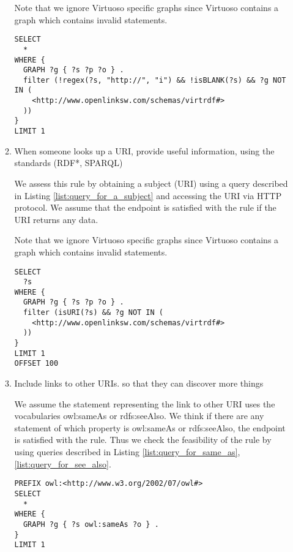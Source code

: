 \documentclass[11pt,a4paper]{article}
\begin{document}
\begin{itemize}
\begin{enumerate}
      Note that we ignore Virtuoso specific graphs since Virtuoso contains a graph which contains invalid statements.

      \begin{lstlisting}[basicstyle=\ttfamily\footnotesize,breaklines=true,frame=single,caption=A Query for searching non-HTTP-URI subjects,label=list:non_http_uri_subject]
SELECT
  *
WHERE {
  GRAPH ?g { ?s ?p ?o } .
  filter (!regex(?s, "http://", "i") && !isBLANK(?s) && ?g NOT IN (
    <http://www.openlinksw.com/schemas/virtrdf#>
  ))
}
LIMIT 1
      \end{lstlisting}

      \item When someone looks up a URI, provide useful information, using the standards (RDF*, SPARQL)

      We assess this rule by obtaining a subject (URI) using a query described in Listing \ref{list:query_for_a_subject} and accessing the URI via HTTP protocol. We assume that the endpoint is satisfied with the rule if the URI returns any data.

      Note that we ignore Virtuoso specific graphs since Virtuoso contains a graph which contains invalid statements.

      \begin{lstlisting}[basicstyle=\ttfamily\footnotesize,breaklines=true,frame=single,caption=A Query for a Subject,label=list:query_for_a_subject]
SELECT
  ?s
WHERE {
  GRAPH ?g { ?s ?p ?o } .
  filter (isURI(?s) && ?g NOT IN (
    <http://www.openlinksw.com/schemas/virtrdf#>
  ))
}
LIMIT 1
OFFSET 100
      \end{lstlisting}

      \item Include links to other URIs. so that they can discover more things

      We assume the statement representing the link to other URI uses the vocabularies owl:sameAs or rdfs:seeAlso. We think if there are any statement of which property is owl:sameAs or rdfs:seeAlso, the endpoint is satisfied with the rule.
      Thus we check the feasibility of the rule by using queries described in Listing \ref{list:query_for_same_as}, \ref{list:query_for_see_also}.

      \begin{lstlisting}[basicstyle=\ttfamily\footnotesize,breaklines=true,frame=single,caption=A Query for a Same AS Statement,label=list:query_for_same_as]
PREFIX owl:<http://www.w3.org/2002/07/owl#>
SELECT
  *
WHERE {
  GRAPH ?g { ?s owl:sameAs ?o } .
}
LIMIT 1
      \end{lstlisting}


\end{enumerate}
\end{itemize}
\end{document}
